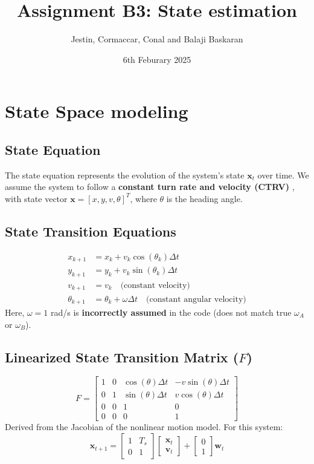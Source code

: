 \documentclass[a4paper,11pt]{article}
\title{Assignment B3: State estimation}
\author{Jestin, Cormaccar, Conal and Balaji Baskaran}
\date{6th Feburary 2025}
\begin{document}
\maketitle

\section*{State Space modeling}

\subsection*{State Equation}
The state equation represents the evolution of the system's state \( \mathbf{x}_t \) over time. We assume the system to follow a \textbf{ constant turn rate and velocity (CTRV) },  with state vector $\mathbf{x} = [x, y, v, \theta]^T$, where $\theta$ is the heading angle.
\subsection*{State Transition Equations}
\begin{align*}
    x_{k+1} &= x_k + v_k \cos(\theta_k) \Delta t \\
    y_{k+1} &= y_k + v_k \sin(\theta_k) \Delta t \\
    v_{k+1} &= v_k \quad \text{(constant velocity)} \\
    \theta_{k+1} &= \theta_k + \omega \Delta t \quad \text{(constant angular velocity)}
\end{align*}
Here, $\omega = 1$ rad/s is \textbf{incorrectly assumed} in the code (does not match true $\omega_A$ or $\omega_B$).

\subsection*{Linearized State Transition Matrix ($F$)}
\begin{equation*}
    F =
    \begin{bmatrix}
        1 & 0 & \cos(\theta)\Delta t & -v \sin(\theta)\Delta t \\
        0 & 1 & \sin(\theta)\Delta t & v \cos(\theta)\Delta t \\
        0 & 0 & 1 & 0 \\
        0 & 0 & 0 & 1
    \end{bmatrix}
\end{equation*}
Derived from the Jacobian of the nonlinear motion model.
For this system:
\[
\mathbf{x}_{t+1} = 
\begin{bmatrix}
1 & T_s \\
0 & 1
\end{bmatrix} \begin{bmatrix}
   \mathbf{x}_t \\ \mathbf{v}_{t} 
\end{bmatrix}
 +
\begin{bmatrix}
0 \\
1
\end{bmatrix}
\mathbf{w}_{t}
\]
\end{document}
